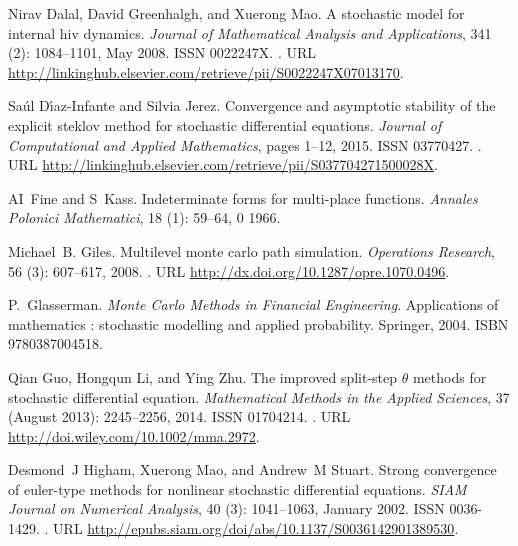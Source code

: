 \documentclass[sort&compress, preprint]{elsarticle}
\theoremstyle{definition}
\theoremstyle{plain}%
\theoremstyle{remark}
\begin{document}
\begin{thebibliography}{36}
Nirav Dalal, David Greenhalgh, and Xuerong Mao.
\newblock A stochastic model for internal hiv dynamics.
\newblock \emph{Journal of Mathematical Analysis and Applications},
  341 (2): 1084--1101, May 2008.
\newblock ISSN 0022247X.
\newblock {}.
\newblock URL
  \url{http://linkinghub.elsevier.com/retrieve/pii/S0022247X07013170}.

Sa\'{u}l D\'{\i}az-Infante and Silvia Jerez.
\newblock Convergence and asymptotic stability of the explicit steklov method
  for stochastic differential equations.
\newblock \emph{Journal of Computational and Applied Mathematics}, pages 1--12,
  2015.
\newblock ISSN 03770427.
\newblock {}.
\newblock URL
  \url{http://linkinghub.elsevier.com/retrieve/pii/S037704271500028X}.

AI~Fine and S~Kass.
\newblock Indeterminate forms for multi-place functions.
\newblock \emph{Annales Polonici Mathematici}, 18 (1):
  59--64, 0 1966.

Michael~B. Giles.
\newblock Multilevel monte carlo path simulation.
\newblock \emph{Operations Research}, 56 (3): 607--617, 2008.
\newblock {}.
\newblock URL \url{http://dx.doi.org/10.1287/opre.1070.0496}.

P.~Glasserman.
\newblock \emph{Monte Carlo Methods in Financial Engineering}.
\newblock Applications of mathematics : stochastic modelling and applied
  probability. Springer, 2004.
\newblock ISBN 9780387004518.

Qian Guo, Hongqun Li, and Ying Zhu.
\newblock The improved split-step $\theta$ methods for stochastic differential
  equation.
\newblock \emph{Mathematical Methods in the Applied Sciences}, 37
  (August 2013): 2245--2256, 2014.
\newblock ISSN 01704214.
\newblock {}.
\newblock URL \url{http://doi.wiley.com/10.1002/mma.2972}.

Desmond~J Higham, Xuerong Mao, and Andrew~M Stuart.
\newblock Strong convergence of euler-type methods for nonlinear stochastic
  differential equations.
\newblock \emph{SIAM Journal on Numerical Analysis}, 40 (3):
  1041--1063, January 2002.
\newblock ISSN 0036-1429.
\newblock {}.
\newblock URL \url{http://epubs.siam.org/doi/abs/10.1137/S0036142901389530}.


\end{thebibliography}
\end{document}
